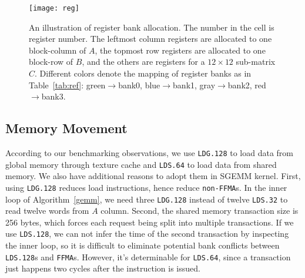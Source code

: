 \begin{figure}[htbp]
\begin{center}
\texttt{[image: reg]}
\caption{An illustration of register bank allocation. The number in the cell is register number.
    The leftmost column registers are allocated to one block-column of $A$, the
topmost row registers are allocated to one block-row of $B$, and the others are registers for
a $12 \times 12$ sub-matrix $C$. Different colors denote the mapping of register banks as in Table~\ref{tab:ref}: green$\rightarrow$bank0,
blue$\rightarrow$bank1, gray$\rightarrow$bank2, red$\rightarrow$bank3.}
\label{fig:reg}
\end{center}
\end{figure}


\subsection{Memory Movement}
According to our benchmarking observations, we use {\tt LDG.128} to load data from global memory through texture cache
and {\tt LDS.64} to load data from shared memory.
We also have additional reasons to adopt them in SGEMM kernel.
First, using {\tt LDG.128} reduces load instructions, hence reduce {\tt non-FFMA}s. %
In the inner loop of Algorithm~\ref{gemm}, we need three {\tt LDG.128} instead of twelve {\tt LDS.32} to read twelve
words from $A$ column.
Second, the shared memory transaction size is 256 bytes, which forces each request being split into multiple transactions.
If we use {\tt LDS.128}, we can not infer the time of the second transaction by inspecting the inner loop, so it is
difficult to eliminate potential bank conflicts between {\tt LDS.128}s and {\tt FFMA}s.
However, it's determinable for {\tt LDS.64}, since a transaction just happens two cycles after the instruction is
issued. 


